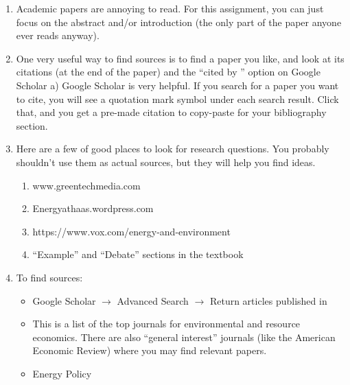 \documentclass[11pt]{article}
\begin{document}
\begin{enumerate}
    \item  Academic papers are annoying to read. For this assignment, you can just focus on the abstract
    and/or introduction (the only part of the paper anyone ever reads anyway).
    \item  One very useful way to find sources is to find a paper you like, and look at its citations (at the
    end of the paper) and the ``cited by \underline{\hspace{10mm}}'' option on Google Scholar
    a) Google Scholar is very helpful. If you search for a paper you want to cite, you will see a quotation mark symbol under each search result. Click that, and you get a pre-made citation to copy-paste for your bibliography section.

    \item  Here are a few of good places to look for research questions. You probably shouldn’t use them as actual sources, but they will help you find ideas.

        \begin{enumerate}
            \item www.greentechmedia.com

            \item Energyathaas.wordpress.com

            \item https://www.vox.com/energy-and-environment

            \item ``Example'' and ``Debate'' sections in the textbook
        \end{enumerate}

    \item To find sources: 

        \begin{itemize}
            \item Google Scholar $\to$ Advanced Search $\to$ Return articles published in \underline{\hspace{10mm}}
            
            \item This is a list of the top journals for environmental and resource economics. There are also ``general interest'' journals (like the American Economic Review) where you may find relevant papers.
            
            \item Energy Policy
            

\end{itemize}
\end{enumerate}
\end{document}
